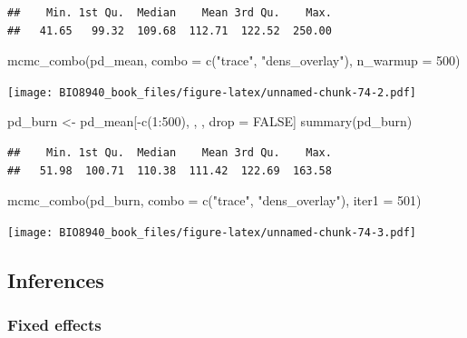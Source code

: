 \documentclass[
  12pt,
]{book}
\newenvironment{Shaded}{\begin{snugshade}}{\end{snugshade}}
\newcommand{\AttributeTok}[1]{\textcolor[rgb]{0.77,0.63,0.00}{#1}}
\newcommand{\ConstantTok}[1]{\textcolor[rgb]{0.00,0.00,0.00}{#1}}
\newcommand{\DecValTok}[1]{\textcolor[rgb]{0.00,0.00,0.81}{#1}}
\newcommand{\FunctionTok}[1]{\textcolor[rgb]{0.00,0.00,0.00}{#1}}
\newcommand{\NormalTok}[1]{#1}
\newcommand{\OtherTok}[1]{\textcolor[rgb]{0.56,0.35,0.01}{#1}}
\newcommand{\SpecialCharTok}[1]{\textcolor[rgb]{0.00,0.00,0.00}{#1}}
\newcommand{\StringTok}[1]{\textcolor[rgb]{0.31,0.60,0.02}{#1}}
\begin{document}
\begin{verbatim}
##    Min. 1st Qu.  Median    Mean 3rd Qu.    Max. 
##   41.65   99.32  109.68  112.71  122.52  250.00
\end{verbatim}

\begin{Shaded}
\begin{Highlighting}[]
\FunctionTok{mcmc\_combo}\NormalTok{(pd\_mean, }\AttributeTok{combo =} \FunctionTok{c}\NormalTok{(}\StringTok{"trace"}\NormalTok{, }\StringTok{"dens\_overlay"}\NormalTok{), }\AttributeTok{n\_warmup =} \DecValTok{500}\NormalTok{)}
\end{Highlighting}
\end{Shaded}

\texttt{[image: BIO8940\_book\_files/figure-latex/unnamed-chunk-74-2.pdf]}

\begin{Shaded}
\begin{Highlighting}[]
\NormalTok{pd\_burn }\OtherTok{\textless{}{-}}\NormalTok{ pd\_mean[}\SpecialCharTok{{-}}\FunctionTok{c}\NormalTok{(}\DecValTok{1}\SpecialCharTok{:}\DecValTok{500}\NormalTok{), , , drop }\OtherTok{=} \ConstantTok{FALSE}\NormalTok{]}
\FunctionTok{summary}\NormalTok{(pd\_burn)}
\end{Highlighting}
\end{Shaded}

\begin{verbatim}
##    Min. 1st Qu.  Median    Mean 3rd Qu.    Max. 
##   51.98  100.71  110.38  111.42  122.69  163.58
\end{verbatim}

\begin{Shaded}
\begin{Highlighting}[]
\FunctionTok{mcmc\_combo}\NormalTok{(pd\_burn, }\AttributeTok{combo =} \FunctionTok{c}\NormalTok{(}\StringTok{"trace"}\NormalTok{, }\StringTok{"dens\_overlay"}\NormalTok{), }\AttributeTok{iter1 =} \DecValTok{501}\NormalTok{)}
\end{Highlighting}
\end{Shaded}

\texttt{[image: BIO8940\_book\_files/figure-latex/unnamed-chunk-74-3.pdf]}

\hypertarget{inferences-1}{%
\subsection{Inferences}\label{inferences-1}}

\hypertarget{fixed-effects-1}{%
\subsubsection{Fixed effects}\label{fixed-effects-1}}
\end{document}
